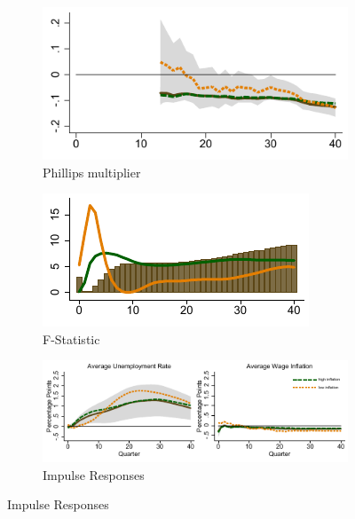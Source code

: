 \documentclass[12pt]{article}
\begin{document}
\begin{figure}[h!]
    \centering 
	\caption{Phillips multiplier and IRFs}
	\label{F:MultiplierQ_SD}
	\begin{subfigure}[b]{0.45\textwidth}
		\caption{Phillips multiplier}
		\label{F:MultiplierQ_SD_M}
		\includegraphics[width=\textwidth]{../Output/Figures/Figure_5a.pdf}	
	\end{subfigure}
	\begin{subfigure}[b]{0.45\textwidth}
		\caption{F-Statistic}
		\label{F:MultiplierQ_SD_F}
		\includegraphics[width=\textwidth]{../Output/Figures/Figure_5b.pdf}
	\end{subfigure}
	\begin{subfigure}[b]{0.9\textwidth}
		\caption{Impulse Responses}
		\label{F:DynamicsQ_SD}
		\includegraphics[width=\textwidth]{../Output/Figures/Figure_5c.pdf}

\end{subfigure}
\end{figure}
\end{document}
